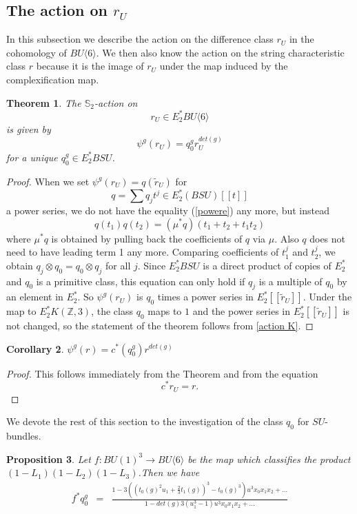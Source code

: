 \documentclass{amsart}
\renewcommand{\S}{{\mathbb S}}
\newcommand {\Z}{{\mathbb Z}}
\numberwithin{equation}{section}
\newtheorem{thm}{Theorem}[section]
\newtheorem{prop}[thm]{Proposition}
\newtheorem{cor}[thm]{Corollary}
\theoremstyle{definition}  %
\newtheorem{set theory}[thm]{Set Theoretic Prelude}
\begin{document}
\subsection{The action on $r_U$}
In this subsection we describe the action on the difference class $r_U$ in the cohomology of $BU\langle 6\rangle$. We then also know the action on the string characteristic class $r$ because
 it is the image of $r_U$ under the map induced by the complexification map.
 \begin{thm} \label{action rU}The $\S_2$-action on
$$r_U\in E_2^*BU\langle 6 \rangle $$
is given by $$\psi^g (r_U) = q_0^g r_U^{det(g)}$$
for a unique $q_0^g\in E_2^*BSU$.
\end{thm}
\begin{proof}
When we set $\psi^g(r_U)=q(\tilde{r}_U)$ for $$q=\sum q_j t^j\in E_2^*(BSU)[[t]]$$ a power series,
we do not have the equality (\ref{powere}) any more, but instead
\begin{equation} \label{mpowere}
q(t_1)q(t_2)=(\mu^*q)(t_1+t_2+t_1t_2)
\end{equation}
where $\mu^*q$ is obtained by pulling back the coefficients of $q$ via $\mu$. Also $q$ does not need to have leading term 1 any more.
Comparing coefficients of $t_1^j$ and $t_2^j$, we obtain $q_j\otimes q_0 = q_0\otimes q_j$ for all $j$.
Since $E_2^*BSU$ is a direct product of copies of $E_2^*$ and $q_0$ is a primitive class, 
this equation can only hold if $q_j$ is a multiple of $q_0$ by an element in $E_2^*$. So $\psi^g(r_U)$ is $q_0$ times 
a power series in $E_2^*[[\tilde{r}_U]]$. Under the map to $E_2^*K(\Z,3)$, the class $q_0$ maps to $1$ and the
power series in $E_2^*[[\tilde{r}_U]]$ is not changed, so the statement of the theorem follows from \ref{action K}.
\end{proof}
\begin{cor}\label{action r}
$\psi^g(r)=c^*(q_0^g)r^{det(g)}$
\end{cor}
\begin{proof}
This follows immediately from the Theorem and from the equation $$c^*r_U=r.$$
\end{proof}
We devote the rest of this section to the investigation of the class $q_0$ for $SU$-bundles.
\begin{prop}
Let
$f:  BU(1)^3\to BU\langle 6\rangle $ be the map which classifies the product $(1-L_1)(1-L_2)(1-L_3)$.Then we have
\begin{eqnarray*}
f^*q_0^g&=& \frac{1-3((t_0(g)^2u_1+\frac{2}{3}t_1(g))^3-t_0(g)^3) u^3x_0x_1x_2+\dots}
{1-det(g)3(u_1^3-1)u^3x_0x_1x_2+\dots}
\end{eqnarray*}
\end{prop}
\end{document}
